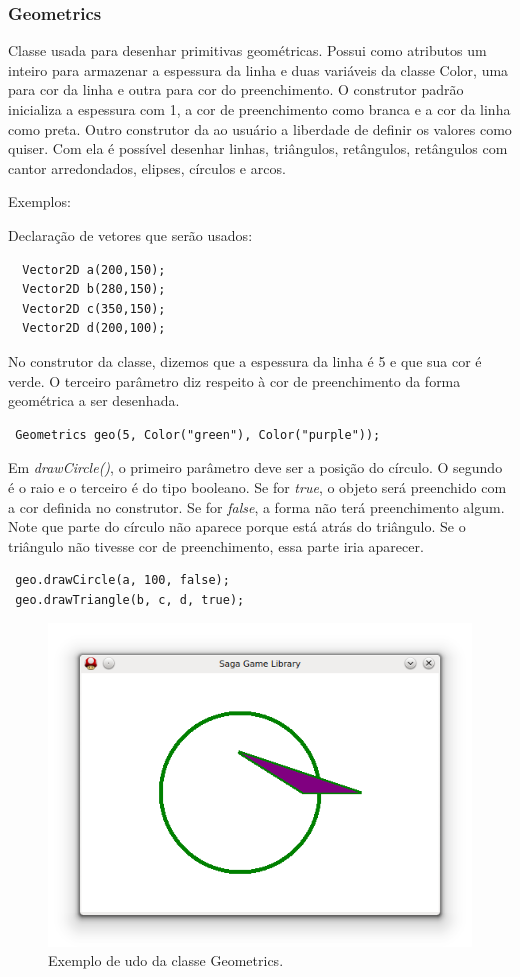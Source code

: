 \subsubsection{Geometrics}
%
%
Classe usada para desenhar primitivas geométricas. Possui como atributos um inteiro para armazenar a espessura da linha e duas variáveis da classe Color, uma para cor da linha e outra para cor do preenchimento. O construtor padrão inicializa a espessura com 1, a cor de preenchimento como branca e a cor da linha como preta. Outro construtor da ao usuário a liberdade de definir os valores como quiser. Com ela é possível desenhar linhas, triângulos, retângulos, retângulos com cantor arredondados, elipses, círculos e arcos. 
\par 
Exemplos: 
\par
Declaração de vetores que serão usados:
%
\begin{lstlisting}
  Vector2D a(200,150);
  Vector2D b(280,150);
  Vector2D c(350,150);
  Vector2D d(200,100);
\end{lstlisting}
%
%
\par 
No construtor da classe, dizemos que a espessura da linha é 5 e que sua cor é verde. O terceiro parâmetro diz respeito à cor de preenchimento da forma geométrica a ser desenhada. 
%
\begin{lstlisting}
 Geometrics geo(5, Color("green"), Color("purple"));
\end{lstlisting}
%
Em \textit{drawCircle()}, o primeiro parâmetro deve ser a posição do círculo. O segundo é o raio e o terceiro é do tipo booleano. Se for \textit{true}, o objeto será preenchido com a cor definida no construtor. Se for \textit{false}, a forma não terá preenchimento algum. Note que parte do círculo não aparece porque está atrás do triângulo. Se o triângulo não tivesse cor de preenchimento, essa parte iria aparecer. 
%
\begin{lstlisting}
 geo.drawCircle(a, 100, false);
 geo.drawTriangle(b, c, d, true);
\end{lstlisting}
%
%
%
\begin{figure}[H]
    \centering
		\caption{Exemplo de udo da classe Geometrics.}
    \label{ExemploGeometric}
    \includegraphics[scale = 0.7]{Imagens/ExemploGeometric.png}
\end{figure}
%
%
